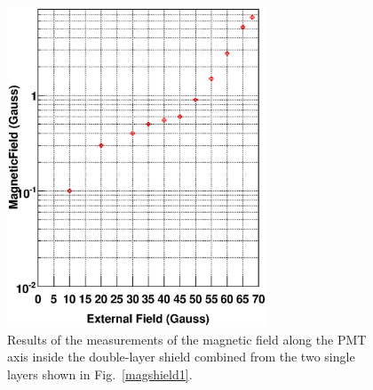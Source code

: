  \begin{figure}
 \hspace{0.5cm}
 \begin{centering}
  \includegraphics[height=9.5cm]{Magnetic-shielding/magshield3.eps}
 \vspace{0.5cm}
 \caption{\small{Results of the measurements of the magnetic field along 
the PMT axis inside the double-layer shield combined from the two single 
layers shown in Fig.~\ref{magshield1}.}}  
\label{magshield2}
\end{centering}
 \end{figure}

